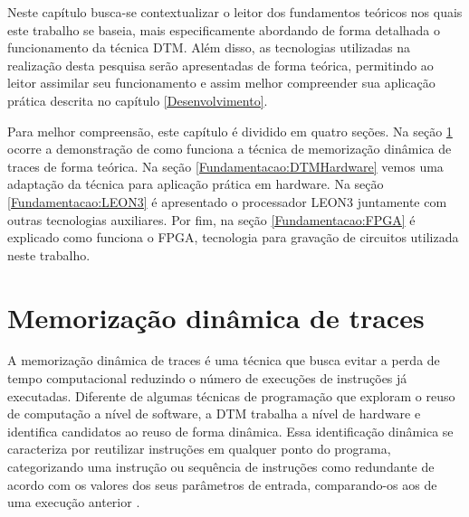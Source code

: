 \label{Fundamentacao}
%
%
%

Neste capítulo busca-se contextualizar o leitor dos fundamentos teóricos nos quais este trabalho se baseia, mais especificamente abordando de forma detalhada o funcionamento da técnica DTM. Além disso, as tecnologias utilizadas na realização desta pesquisa serão apresentadas de forma teórica, permitindo ao leitor assimilar seu funcionamento e assim melhor compreender sua aplicação prática descrita no capítulo \ref{Desenvolvimento}.

Para melhor compreensão, este capítulo é dividido em quatro seções. Na seção \ref{Fundamentacao:DTM} ocorre a demonstração de como funciona a técnica de memorização dinâmica de traces de forma teórica. Na seção \ref{Fundamentacao:DTMHardware} vemos uma adaptação da técnica para aplicação prática em hardware. Na seção \ref{Fundamentacao:LEON3} é apresentado o processador LEON3 juntamente com outras tecnologias auxiliares. Por fim, na seção \ref{Fundamentacao:FPGA} é explicado como funciona o FPGA, tecnologia para gravação de circuitos utilizada neste trabalho.


\section{Memorização dinâmica de traces}
\label{Fundamentacao:DTM}

A memorização dinâmica de traces é uma técnica que busca evitar a perda de tempo computacional reduzindo o número de execuções de instruções já executadas. Diferente de algumas técnicas de programação que exploram o reuso de computação a nível de software, a DTM trabalha a nível de hardware e identifica candidatos ao reuso de forma dinâmica. Essa identificação dinâmica se caracteriza por reutilizar instruções em qualquer ponto do programa, categorizando uma instrução ou sequência de instruções como redundante de acordo com os valores dos seus parâmetros de entrada, comparando-os aos de uma execução anterior \cite{costa2001explorando}.


